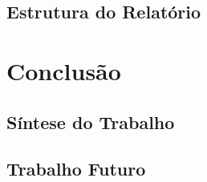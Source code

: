 \documentclass[12pt,a4paper]{report}
\begin{document}
\section{Estrutura do Relatório}




\chapter{Conclusão}
\label{ch:conclusao}

\section{Síntese do Trabalho}


\section{Trabalho Futuro}



\end{document}
